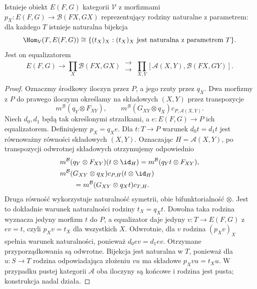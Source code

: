\begin{twierdzenie}\label{cat:thm:enriched-functor-hom}
Istnieje obiekt $E(F,G)$ kategorii $\mathcal V$ z morfizmami $p_X:E(F,G)\to\mathcal B(FX,GX)$ reprezentujący rodziny naturalne z parametrem: dla każdego $T$ istnieje naturalna bijekcja
\[
 \Hom_{\mathcal V}(T,E(F,G))
 \cong\{(t_X)_X:(t_X)_X\text{ jest naturalna z parametrem }T\}.
\]
Jest on equalizatorem
\begin{equation}\label{cat:eq:enriched-nat-equalizer}
 E(F,G)\longrightarrow
 \prod_X\mathcal B(FX,GX)
 \ \substack{\longrightarrow\\[-2pt]\longrightarrow}\
 \prod_{X,Y}[\mathcal A(X,Y),\mathcal B(FX,GY)].
\end{equation}
\end{twierdzenie}
\begin{proof}
Oznaczmy środkowy iloczyn przez $P$, a jego rzuty przez $q_X$. Dwa morfizmy z $P$ do prawego iloczynu określamy na składowych $(X,Y)$ przez transpozycje
\[
 m^{\mathcal B}(q_Y\otimes F_{XY}),\qquad
 m^{\mathcal B}(G_{XY}\otimes q_X)c_{P,\mathcal A(X,Y)}.
\]
Niech $d_0,d_1$ będą tak określonymi strzałkami, a $e:E(F,G)\to P$ ich equalizatorem. Definiujemy $p_X=q_Xe$. Dla $t:T\to P$ warunek $d_0t=d_1t$ jest równoważny równości składowych $(X,Y)$. Oznaczając $H=\mathcal A(X,Y)$, po transpozycji odwrotnej składowych otrzymujemy odpowiednio
\[
\begin{aligned}
 &m^{\mathcal B}(q_Y\otimes F_{XY})(t\otimes\id_H)
 =m^{\mathcal B}(q_Yt\otimes F_{XY}),\\
 &m^{\mathcal B}(G_{XY}\otimes q_X)c_{P,H}(t\otimes\id_H)\\
 &\qquad=m^{\mathcal B}(G_{XY}\otimes q_Xt)c_{T,H}.
\end{aligned}
\]
Druga równość wykorzystuje naturalność symetrii, obie bifunktorialność $\otimes$. Jest to dokładnie warunek naturalności rodziny $t_X=q_Xt$. Dowolna taka rodzina wyznacza jedyny morfizm $t$ do $P$, a equalizator daje jedyny $v:T\to E(F,G)$ z $ev=t$, czyli $p_Xv=t_X$ dla wszystkich $X$. Odwrotnie, dla $v$ rodzina $(p_Xv)_X$ spełnia warunek naturalności, ponieważ $d_0ev=d_1ev$. Otrzymane przyporządkowania są odwrotne. Bijekcja jest naturalna w $T$, ponieważ dla $u:S\to T$ rodzina odpowiadająca złożeniu $vu$ ma składowe $p_Xvu=t_Xu$. W przypadku pustej kategorii $\mathcal A$ oba iloczyny są końcowe i rodzina jest pusta; konstrukcja nadal działa.
\end{proof}


